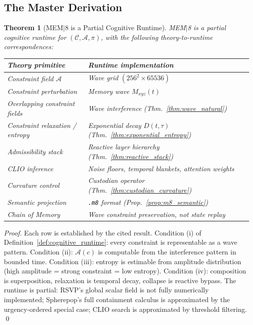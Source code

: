 \documentclass[12pt, a4paper, twoside]{article}
\theoremstyle{plain}
\newtheorem{theorem}{Theorem}[section]
\theoremstyle{definition}
\theoremstyle{remark}
\newcommand{\Acc}{\mathcal{A}}
\newcommand{\Conf}{\mathcal{C}}
\newcommand{\Proj}{\pi}
\begin{document}
\subsection{The Master Derivation}

\begin{theorem}[MEM$|$8 is a Partial Cognitive Runtime]
\label{thm:mem8_runtime}
MEM$|$8 is a partial cognitive runtime for $(\Conf, \Acc, \Proj)$, with the
following theory-to-runtime correspondences:

\begin{center}
\renewcommand{\arraystretch}{1.4}
\begin{tabular}{@{}p{5.5cm}p{5.5cm}@{}}
\toprule
\textbf{Theory primitive} & \textbf{Runtime implementation} \\
\midrule
Constraint field $\Acc$ & Wave grid $(256^2 \times 65536)$ \\
Constraint perturbation  & Memory wave $M_{xyz}(t)$ \\
Overlapping constraint fields & Wave interference (Thm.~\ref{thm:wave_natural}) \\
Constraint relaxation / entropy & Exponential decay $D(t,\tau)$ (Thm.~\ref{thm:exponential_entropy}) \\
Admissibility stack      & Reactive layer hierarchy (Thm.~\ref{thm:reactive_stack}) \\
CLIO inference           & Noise floors, temporal blankets, attention weights \\
Curvature control        & Custodian operator (Thm.~\ref{thm:custodian_curvature}) \\
Semantic projection      & \texttt{.m8} format (Prop.~\ref{prop:m8_semantic}) \\
Chain of Memory          & Wave constraint preservation, not state replay \\
\bottomrule
\end{tabular}
\end{center}
\end{theorem}

\begin{proof}
Each row is established by the cited result. Condition (i) of
Definition~\ref{def:cognitive_runtime}: every constraint is representable as a
wave pattern. Condition (ii): $\Acc(c)$ is computable from the interference
pattern in bounded time. Condition (iii): entropy is estimable from amplitude
distribution (high amplitude = strong constraint = low entropy). Condition
(iv): composition is superposition, relaxation is temporal decay, collapse is
reactive bypass. The runtime is partial: RSVP's global scalar field is not
fully numerically implemented; Spherepop's full containment calculus is
approximated by the urgency-ordered special case; CLIO search is approximated
by threshold filtering. \qed
\end{proof}
\end{document}
